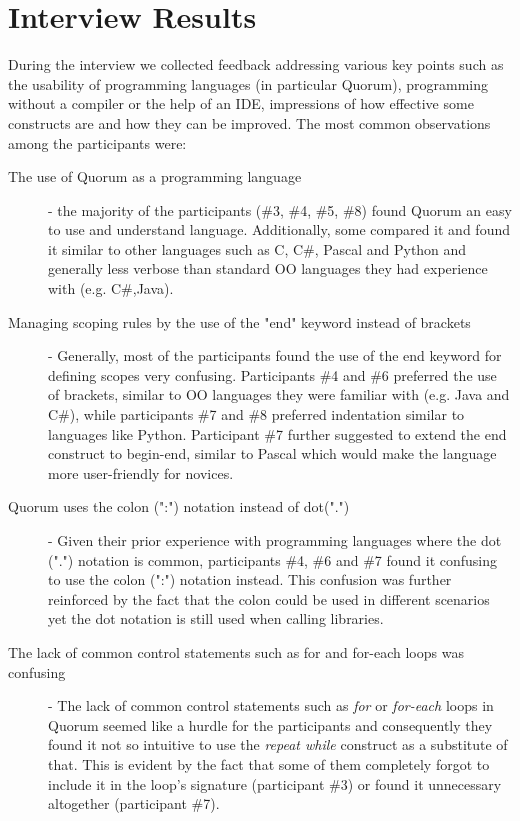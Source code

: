 \section{Interview Results}
During the interview we collected feedback addressing various key points such as the usability of programming languages (in particular Quorum), programming without a compiler or the help of an IDE, impressions of how effective some constructs are and how they can be improved. The most common observations among the participants were:

\begin{description}
\item[The use of Quorum as a programming language] - the majority of the participants (\#3, \#4, \#5, \#8) found Quorum an easy to use and understand language. Additionally, some compared it and found it similar to other languages such as C, C\#, Pascal and Python and generally less verbose than standard OO languages they had experience with (e.g. C\#,Java). 
\item[Managing scoping rules by the use of the "end" keyword instead of brackets] - Generally, most of the participants found the use of the end keyword for defining scopes very confusing. Participants \#4 and \#6 preferred the use of brackets, similar to OO languages they were familiar with (e.g. Java and C\#), while participants \#7 and \#8 preferred indentation similar to languages like Python. Participant \#7 further suggested to extend the end construct to begin-end, similar to Pascal which would make the language more user-friendly for novices. 
\item[Quorum uses the colon (":") notation instead of dot(".")] - Given their prior experience with programming languages where the dot (".") notation is common, participants \#4, \#6 and \#7 found it confusing to use the  colon (":") notation instead. This confusion was further reinforced by the fact that the colon could be used in different scenarios yet the dot notation is still used when calling libraries.
\item[The lack of common control statements such as for and for-each loops was confusing] - The lack of common control statements such as \textit{for} or \textit{for-each} loops in Quorum seemed like a hurdle for the participants and consequently they found it not so intuitive to use the \textit{repeat while} construct as a substitute of that. This is evident by the fact that some of them completely forgot to include it in the loop's signature (participant \#3) or found it unnecessary altogether (participant \#7).
\end{description}